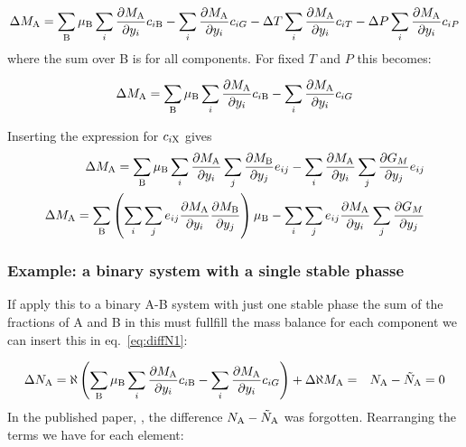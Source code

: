 \documentclass[12pt]{article}
\begin{document}
\begin{eqnarray}
\Delta M_{\rm A} =
\sum_{\rm B} \mu_{\rm B}
\sum_i \frac{\partial M_{\rm A}}{\partial y_i} c_{i{\rm B}} -
\sum_i \frac{\partial M_{\rm A}}{\partial y_i} c_{iG}-
\Delta T\sum_i \frac{\partial M_{\rm A}}{\partial y_i} c_{iT}-
\Delta P\sum_i \frac{\partial M_{\rm A}}{\partial y_i} c_{iP}
\label{eq:diffm2}
\end{eqnarray}
where the sum over B is for all components.  For fixed $T$ and $P$
this becomes:

\begin{eqnarray}
\Delta M_{\rm A} =
\sum_{\rm B} \mu_{\rm B}
\sum_i \frac{\partial M_{\rm A}}{\partial y_i} c_{i{\rm B}} -
\sum_i \frac{\partial M_{\rm A}}{\partial y_i} c_{iG}
\label{eq:diffmnoTP}
\end{eqnarray}

Inserting the expression for $c_{i\rm X}$ gives
\begin{eqnarray}
\Delta M_{\rm A} =
\sum_{\rm B} \mu_{\rm B}
\sum_i \frac{\partial M_{\rm A}}{\partial y_i}\sum_j\frac{\partial M_{\rm B}}{\partial y_j}e_{ij} -
\sum_i \frac{\partial M_{\rm A}}{\partial y_i}\sum_j\frac{\partial G_M}{\partial y_j}e_{ij}\nonumber\\
\Delta M_{\rm A} =
\sum_{\rm B} \left(\sum_i \sum_j e_{ij}\frac{\partial M_{\rm A}}{\partial y_i}\frac{\partial M_{\rm B}}{\partial y_j}\right)\mu_{\rm B}-
\sum_i\sum_j e_{ij}\frac{\partial M_{\rm A}}{\partial y_i}\sum_j\frac{\partial G_M}{\partial y_j}
\label{eq:diffmnoTP2}
\end{eqnarray}

\subsubsection{Example: a binary system with a single stable phasse}

If apply this to a binary A-B system with just one stable phase the
sum of the fractions of A and B in this must fullfill the mass balance
for each component we can insert this in eq.~\ref{eq:diffN1}:

\begin{eqnarray}
\Delta N_{\rm A}=\aleph \left(
\sum_{\rm B} \mu_{\rm B}
\sum_i \frac{\partial M_{\rm A}}{\partial y_i} c_{i{\rm B}} -
\sum_i \frac{\partial M_{\rm A}}{\partial y_i} c_{iG}\right) +
\Delta \aleph M_{\rm A} &=& N_{\rm A} - \tilde N_{\rm A} = 0
\end{eqnarray}
In the published paper, \cite{15Sun2}, the difference $N_{\rm
  A}-\tilde N_{\rm A}$ was forgotten.  Rearranging the terms we have
for each element:
\end{document}
